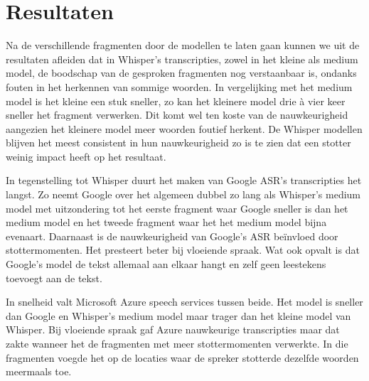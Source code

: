 
\chapter{Resultaten}%
\label{ch:resultaten}

Na de verschillende fragmenten door de modellen te laten gaan kunnen we uit de resultaten afleiden dat in Whisper's transcripties, zowel in het kleine als medium model, de boodschap van de gesproken fragmenten nog verstaanbaar is, ondanks fouten in het herkennen van sommige woorden. In vergelijking met het medium model is het kleine een stuk sneller, zo kan het kleinere model drie à vier keer sneller het fragment verwerken. Dit komt wel ten koste van de nauwkeurigheid aangezien het kleinere model meer woorden foutief herkent. De Whisper modellen blijven het meest consistent in hun nauwkeurigheid zo is te zien dat een stotter weinig impact heeft op het resultaat.

In tegenstelling tot Whisper duurt het maken van Google ASR's transcripties het langst. Zo neemt Google over het algemeen dubbel zo lang als Whisper's medium model met uitzondering tot het eerste fragment waar Google sneller is dan het medium model en het tweede fragment waar het het medium model bijna evenaart. Daarnaast is de nauwkeurigheid van Google's ASR beïnvloed door stottermomenten. Het presteert beter bij vloeiende spraak. Wat ook opvalt is dat Google's model de tekst allemaal aan elkaar hangt en zelf geen leestekens toevoegt aan de tekst.

In snelheid valt Microsoft Azure speech services tussen beide. Het model is sneller dan Google en Whisper's medium model maar trager dan het kleine model van Whisper. Bij vloeiende spraak gaf Azure nauwkeurige transcripties maar dat zakte wanneer het de fragmenten met meer stottermomenten verwerkte. In die fragmenten voegde het op de locaties waar de spreker stotterde dezelfde woorden meermaals toe.